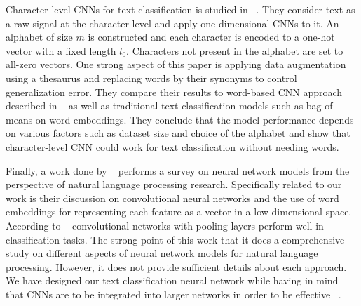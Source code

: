 \documentclass{article} %
\begin{document}
%

Character-level CNNs for text classification is studied in ~\cite{nips_text}. They consider text as a raw signal at the character level and apply one-dimensional CNNs to it. An alphabet of size $m$ is constructed and each character is encoded to a one-hot vector with a fixed length $l_0$. Characters not present in the alphabet are set to all-zero vectors. One strong aspect of this paper is applying data augmentation using a thesaurus and replacing words by their synonyms to control generalization error. They compare their results to word-based CNN approach described in ~\cite{convtext} as well as traditional text classification models such as bag-of-means on word embeddings. They conclude that the model performance depends on various factors such as dataset size and choice of the alphabet and show that character-level CNN could work for text classification without needing words.

Finally, a work done by ~\cite{nn_survery} performs a survey on neural network models from the perspective of natural language processing research. Specifically related to our work is their discussion on convolutional neural networks and the use of word embeddings for representing each feature as a vector in a low dimensional space. According to ~\cite{nn_survery} convolutional networks with pooling layers perform well in classification tasks. The strong point of this work that it does a comprehensive study on different aspects of neural network models for natural language processing. However, it does not provide sufficient details about each approach. We have designed our text classification neural network while having in mind that CNNs are to be integrated into larger networks in order to be effective ~\cite{goldberg2017neural}.
\end{document}
